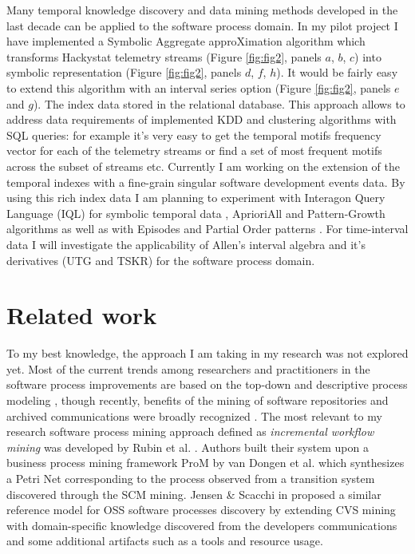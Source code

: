 \documentclass[11pt,oneside]{article}
\begin{document}
Many temporal knowledge discovery and data mining methods developed in the last decade can be applied to the software process domain. In my pilot project I have implemented a Symbolic Aggregate approXimation algorithm \cite{citeulike:2821475} which transforms Hackystat telemetry streams (Figure \ref{fig:fig2}, panels $a$, $b$, $c$) into symbolic representation (Figure \ref{fig:fig2}, panels $d$, $f$, $h$). It would be fairly easy to extend this algorithm with an interval series option (Figure \ref{fig:fig2}, panels $e$ and $g$). The index data stored in the relational database. This approach allows to address data requirements of implemented KDD and clustering algorithms with SQL queries: for example it's very easy to get the temporal motifs frequency vector for each of the telemetry streams or find a set of most frequent motifs across the subset of streams etc. Currently I am working on the extension of the temporal indexes with a fine-grain singular software development events data. By using this rich index data I am planning to experiment with Interagon Query Language (IQL) for symbolic temporal data \cite{citeulike:5043086}, AprioriAll \cite{citeulike:775528} and Pattern-Growth algorithms \cite{citeulike:5043097} as well as with Episodes \cite{citeulike:5043099} and Partial Order patterns \cite{citeulike:5043101}. For time-interval data I will investigate the applicability of Allen's interval algebra \cite{citeulike:191348} and it's derivatives (UTG \cite{citeulike:5043086} and TSKR\cite{citeulike:3978076}) for the software process domain. 

\section{Related work}
To my best knowledge, the approach I am taking in my research was not explored yet. Most of the current trends among researchers and practitioners in the software process improvements are based on the top-down and descriptive process modeling \cite{citeulike:5043670}, though recently, benefits of the mining of software repositories and archived communications were broadly recognized \cite{citeulike:5043676}. The most relevant to my research software process mining approach defined as \textit{incremental workflow mining} was developed by Rubin et al. \cite{citeulike:1885717}. Authors built their system upon a business process mining framework ProM by van Dongen et al.\cite{citeulike:5043673} which synthesizes a Petri Net corresponding to the process observed from a transition system discovered through the SCM mining. Jensen \& Scacchi in \cite{citeulike:5043664} proposed a similar reference model for OSS software processes discovery by extending CVS mining with domain-specific knowledge discovered from the developers communications and some additional artifacts such as a tools and resource usage. 
\end{document}
